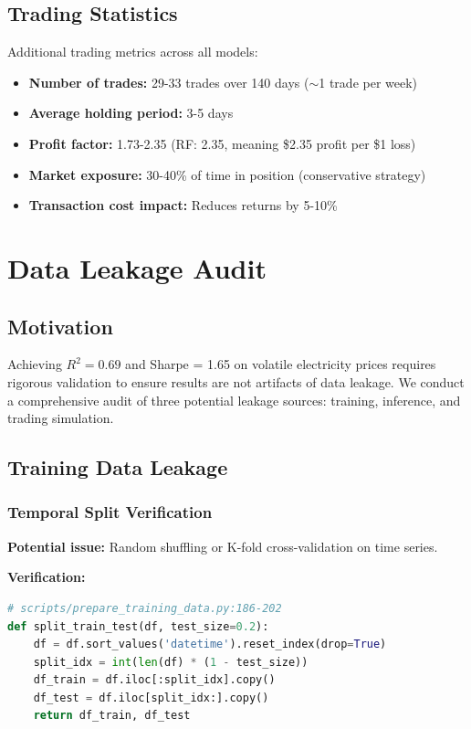 \documentclass[11pt,a4paper]{article}
\begin{document}
\subsection{Trading Statistics}

Additional trading metrics across all models:

\begin{itemize}
    \item \textbf{Number of trades:} 29-33 trades over 140 days ($\sim$1 trade per week)
    \item \textbf{Average holding period:} 3-5 days
    \item \textbf{Profit factor:} 1.73-2.35 (RF: 2.35, meaning \$2.35 profit per \$1 loss)
    \item \textbf{Market exposure:} 30-40\% of time in position (conservative strategy)
    \item \textbf{Transaction cost impact:} Reduces returns by 5-10\%
\end{itemize}

\section{Data Leakage Audit}

\subsection{Motivation}

Achieving $R^2 = 0.69$ and Sharpe = 1.65 on volatile electricity prices requires rigorous validation to ensure results are not artifacts of data leakage. We conduct a comprehensive audit of three potential leakage sources: training, inference, and trading simulation.

\subsection{Training Data Leakage}

\subsubsection{Temporal Split Verification}

\textbf{Potential issue:} Random shuffling or K-fold cross-validation on time series.

\textbf{Verification:}
\begin{lstlisting}[language=Python]
# scripts/prepare_training_data.py:186-202
def split_train_test(df, test_size=0.2):
    df = df.sort_values('datetime').reset_index(drop=True)
    split_idx = int(len(df) * (1 - test_size))
    df_train = df.iloc[:split_idx].copy()
    df_test = df.iloc[split_idx:].copy()
    return df_train, df_test
\end{lstlisting}
\end{document}
